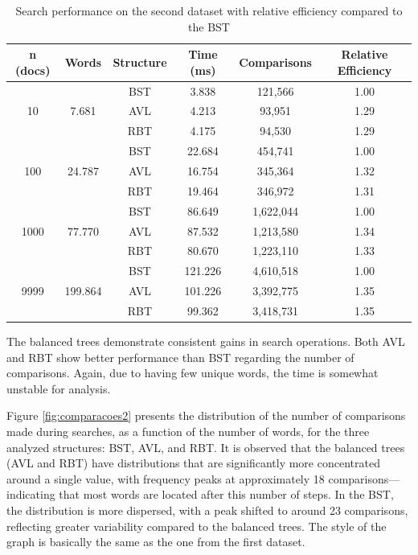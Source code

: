  \begin{table}[H]
     \centering
     \begin{tabular}{|c|c|c|c|c|c|}
     \hline
     \textbf{n (docs)} & \textbf{Words} & \textbf{Structure} & \textbf{Time (ms)} & \textbf{Comparisons} & \textbf{Relative Efficiency} \\
     \hline
     \multirow{3}{*}{10} & \multirow{3}{*}{7.681} & BST & 3.838 & 121,566 & 1.00 \\
     & & AVL & 4.213 & 93,951 & 1.29 \\
     & & RBT & 4.175 & 94,530 & 1.29 \\
     \hline
     \multirow{3}{*}{100} & \multirow{3}{*}{24.787} & BST & 22.684 & 454,741 & 1.00 \\
     & & AVL & 16.754 & 345,364 & 1.32 \\
     & & RBT & 19.464 & 346,972 & 1.31 \\
     \hline
     \multirow{3}{*}{1000} & \multirow{3}{*}{77.770} & BST & 86.649 & 1,622,044 & 1.00 \\
     & & AVL & 87.532 & 1,213,580 & 1.34 \\
     & & RBT & 80.670 & 1,223,110 & 1.33 \\
     \hline
     \multirow{3}{*}{9999} & \multirow{3}{*}{199.864} & BST & 121.226 & 4,610,518 & 1.00 \\
     & & AVL & 101.226 & 3,392,775 & 1.35 \\
     & & RBT & 99.362 & 3,418,731 & 1.35 \\
     \hline
     \end{tabular}
     \caption{Search performance on the second dataset with relative efficiency compared to the BST}
     \label{tab:busca_db2}
 \end{table}

 The balanced trees demonstrate consistent gains in search operations.
 Both AVL and RBT show better performance than BST regarding the number
 of comparisons. Again, due to having few unique words, the time is somewhat unstable for
 analysis.

Figure \ref{fig:comparacoes2} presents the distribution of the number of comparisons made
 during searches, as a function of the number of words, for the three analyzed structures:
 BST, AVL, and RBT. It is observed that the balanced trees (AVL and RBT) have distributions
 that are significantly more concentrated around a single value, with frequency peaks at
 approximately 18 comparisons—indicating that most words are located after this
 number of steps. In the BST, the distribution is more dispersed, with a peak
 shifted to around 23 comparisons, reflecting greater variability compared to the balanced trees.
 The style of the graph is basically the same as the one from the first dataset.


